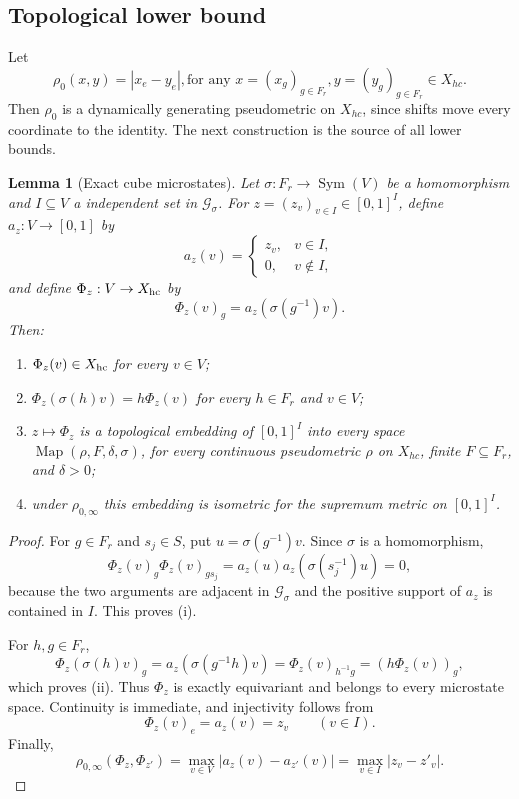 \documentclass[12pt,a4paper]{amsart}
\newtheorem{lemma}[theorem]{Lemma}
\theoremstyle{definition}
\newcommand{\Map}{\operatorname{Map}}
\newcommand{\Sym}{\operatorname{Sym}}
\newcommand{\cG}{\mathcal G}
\begin{document}
	
	
	\subsection{Topological lower bound}
Let
	\[
	\rho_0(x,y)=|x_e-y_e|,\text{for any~}x=(x_{g})_{g \in F_r},y=(y_{g})_{g \in F_r}\in X_{hc}.
	\]
	Then $\rho_0$ is a dynamically generating pseudometric on $X_{hc}$, since shifts move every coordinate to the identity.
	The next construction is the source of all lower bounds.
	
	\begin{lemma}[Exact cube microstates]\label{lem:exact-cube}
		Let $\sigma:F_r\to\Sym(V)$ be a homomorphism and $I\subseteq V$ a independent set in $\cG_\sigma$.  For $z=(z_v)_{v\in I}\in[0,1]^I$, define $a_z:V\to[0,1]$ by
		\[
		a_z(v)=\begin{cases}z_v,&v\in I,\\0,&v\notin I,\end{cases}
		\]
		and define $\Phi_z:V\to X_{\rm hc}$ by
		\begin{equation}\label{eq:pullback}
			\Phi_z(v)_g=a_z(\sigma(g^{-1})v).
		\end{equation}
		Then:
		\begin{enumerate}[label=\textup{(\roman*)}]
			\item $\Phi_z(v)\in X_{\rm hc}$ for every $v\in V$;
			\item $\Phi_z(\sigma(h)v)=h\Phi_z(v)$ for every $h\in F_r$ and $v\in V$;
			\item $z\mapsto\Phi_z$ is a topological embedding of $[0,1]^I$ into every space $\Map(\rho,F,\delta,\sigma)$, for every continuous pseudometric $\rho$ on $X_{hc}$, finite $F\subseteq F_r$, and $\delta>0$;
			\item under $\rho_{0,\infty}$ this embedding is isometric for the supremum metric on $[0,1]^I$.
		\end{enumerate}
	\end{lemma}
	
	\begin{proof}
		For $g\in F_r$ and $s_j\in S$, put $u=\sigma(g^{-1})v$.  Since $\sigma$ is a homomorphism,
		\[
		\Phi_z(v)_g\Phi_z(v)_{gs_j}
		=a_z(u)a_z(\sigma(s_j^{-1})u)=0,
		\]
		because the two arguments are adjacent in $\cG_\sigma$ and the positive support of $a_z$ is contained in $I$.  This proves (i).
		
		For $h,g\in F_r$,
		\[
		\Phi_z(\sigma(h)v)_g
		=a_z(\sigma(g^{-1}h)v)
		=\Phi_z(v)_{h^{-1}g}
		=(h\Phi_z(v))_g,
		\]
		which proves (ii).  Thus $\Phi_z$ is exactly equivariant and belongs to every microstate space.  Continuity is immediate, and injectivity follows from
		\[
		\Phi_z(v)_e=a_z(v)=z_v\qquad(v\in I).
		\]
		Finally,
		\[
		\rho_{0,\infty}(\Phi_z,\Phi_{z'})
		=\max_{v\in V}|a_z(v)-a_{z'}(v)|
		=\max_{v\in I}|z_v-z'_v|.
		\]
	\end{proof}
	
\end{document}
